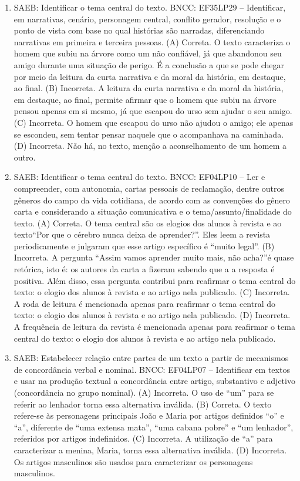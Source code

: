 \begin{enumerate}
\item
SAEB: Identificar o tema central do texto. BNCC: EF35LP29 -- Identificar, em narrativas, cenário, personagem central, conflito gerador, resolução e o ponto de vista com base no qual histórias são narradas, diferenciando narrativas em primeira e terceira pessoas. 
(A) Correta. O texto caracteriza o homem que subiu na árvore como um não confiável, já que abandonou seu amigo durante uma situação de perigo. É a conclusão a que se pode chegar por meio da leitura da curta narrativa e da moral da história, em destaque, ao final. 
(B) Incorreta. A leitura da curta narrativa e da moral da história, em destaque, ao final, permite afirmar que o homem que subiu na árvore pensou apenas em si mesmo, já que escapou do urso sem ajudar o seu amigo. 
(C) Incorreta. O homem que escapou do urso não ajudou o amigo; ele apenas se escondeu, sem tentar pensar naquele que o acompanhava na caminhada. 
(D) Incorreta. Não há, no texto, menção a aconselhamento de um homem a outro.

\item
SAEB: Identificar o tema central do texto. BNCC: EF04LP10 -- Ler e compreender, com autonomia, cartas pessoais de reclamação, dentre outros gêneros do campo da vida cotidiana, de acordo com as convenções do gênero carta e considerando a situação comunicativa e o tema/assunto/finalidade do texto. 
(A) Correta. O tema central são os elogios dos alunos à revista e ao texto``Por que o cérebro nunca deixa de aprender?''. Eles leem a revista periodicamente e julgaram que esse artigo específico é ``muito legal''. 
(B) Incorreta. A pergunta ``Assim vamos aprender muito mais, não acha?''é quase retórica, isto é: os autores da carta a fizeram sabendo que a a resposta é positiva. Além disso, essa pergunta contribui para reafirmar o tema central do texto: o elogio dos alunos à revista e ao artigo nela publicado. 
(C) Incorreta. A roda de leitura é mencionada apenas para reafirmar o tema central do texto: o elogio dos alunos à revista e ao artigo nela publicado. 
(D) Incorreta. A frequência de leitura da revista é mencionada apenas para reafirmar o tema central do texto: o elogio dos alunos à revista e ao artigo nela publicado.

\item
SAEB: Estabelecer relação entre partes de um texto a partir de mecanismos de concordância verbal e nominal. BNCC: EF04LP07 -- Identificar em textos e usar na produção textual a concordância entre artigo, substantivo e adjetivo (concordância no grupo nominal). 
(A) Incorreta. O uso de ``um'' para se referir ao lenhador torna essa alternativa inválida. 
(B) Correta. O texto refere-se às personagens principais João e Maria por artigos definidos ``o'' e ``a'', diferente de ``uma extensa mata'', ``uma cabana pobre'' e ``um lenhador'', referidos por artigos indefinidos. 
(C) Incorreta. A utilização de ``a'' para caracterizar a menina, Maria, torna essa alternativa inválida. 
(D) Incorreta. Os artigos masculinos são usados para caracterizar os personagens masculinos.


\end{enumerate}
